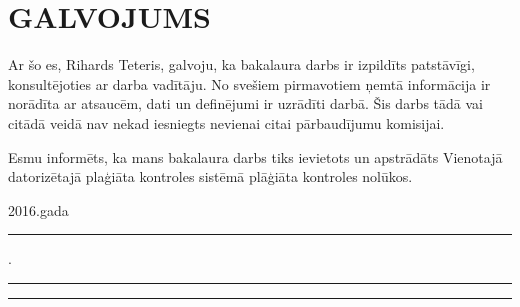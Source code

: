 \chapter*{GALVOJUMS}
\vspace{60pt}
Ar šo es, Rihards Teteris, galvoju, ka bakalaura darbs ir izpildīts patstāvīgi,
konsultējoties ar darba vadītāju. No svešiem pirmavotiem ņemtā informācija ir
norādīta ar atsaucēm, dati un definējumi ir uzrādīti darbā.
Šis darbs tādā vai citādā veidā nav nekad iesniegts nevienai citai pārbaudījumu komisijai.

Esmu informēts, ka mans bakalaura darbs tiks ievietots un apstrādāts
Vienotajā datorizētajā plaģiāta kontroles sistēmā plāģiāta kontroles nolūkos.

\vspace{60pt}
\vspace{1in}

2016.gada \rule{1cm}{0.2pt}.\rule{3cm}{0.2pt} \hspace{3cm}\rule{5cm}{0.2pt}

 \hspace*{11cm}{\raisebox{1em}{(paraksts)}}
\label{LastPage}